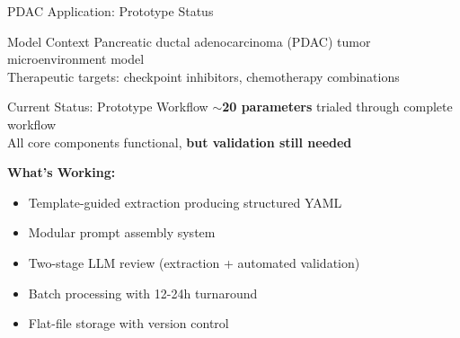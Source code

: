 \documentclass[10pt]{beamer}
\begin{document}
\begin{frame}{PDAC Application: Prototype Status}

  \begin{block}{Model Context}
    Pancreatic ductal adenocarcinoma (PDAC) tumor microenvironment model\\
    Therapeutic targets: checkpoint inhibitors, chemotherapy combinations
  \end{block}

  \vspace{0.3cm}

  \begin{alertblock}{Current Status: Prototype Workflow}
    \textbf{$\sim$20 parameters} trialed through complete workflow\\
    All core components functional, \textbf{but validation still needed}
  \end{alertblock}

  \vspace{0.3cm}

  \textbf{What's Working:}
  \begin{itemize}
    \item Template-guided extraction producing structured YAML
    \item Modular prompt assembly system
    \item Two-stage LLM review (extraction + automated validation)
    \item Batch processing with 12-24h turnaround
    \item Flat-file storage with version control
  \end{itemize}

\end{frame}
\end{document}
